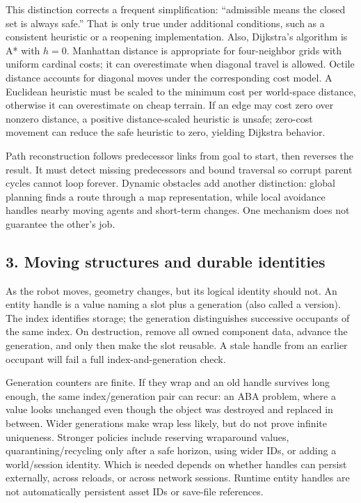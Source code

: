This distinction corrects a frequent simplification: ``admissible means the closed set is always safe.'' That is only true under additional conditions, such as a consistent heuristic or a reopening implementation. Also, Dijkstra's algorithm is A* with \(h=0\). Manhattan distance is appropriate for four-neighbor grids with uniform cardinal costs; it can overestimate when diagonal travel is allowed. Octile distance accounts for diagonal moves under the corresponding cost model. A Euclidean heuristic must be scaled to the minimum cost per world-space distance, otherwise it can overestimate on cheap terrain. If an edge may cost zero over nonzero distance, a positive distance-scaled heuristic is unsafe; zero-cost movement can reduce the safe heuristic to zero, yielding Dijkstra behavior.

Path reconstruction follows predecessor links from goal to start, then reverses the result. It must detect missing predecessors and bound traversal so corrupt parent cycles cannot loop forever. Dynamic obstacles add another distinction: global planning finds a route through a map representation, while local avoidance handles nearby moving agents and short-term changes. One mechanism does not guarantee the other's job.

\subsection{3. Moving structures and durable identities}\label{05-engine-i-ch008-moving-structures-and-durable-identities}

\hypertarget{05-engine-i-ch008-moving-structures-and-durable-identities}{}

As the robot moves, geometry changes, but its logical identity should not. An entity handle is a value naming a slot plus a generation (also called a version). The index identifies storage; the generation distinguishes successive occupants of the same index. On destruction, remove all owned component data, advance the generation, and only then make the slot reusable. A stale handle from an earlier occupant will fail a full index-and-generation check.

Generation counters are finite. If they wrap and an old handle survives long enough, the same index/generation pair can recur: an ABA problem, where a value looks unchanged even though the object was destroyed and replaced in between. Wider generations make wrap less likely, but do not prove infinite uniqueness. Stronger policies include reserving wraparound values, quarantining/recycling only after a safe horizon, using wider IDs, or adding a world/session identity. Which is needed depends on whether handles can persist externally, across reloads, or across network sessions. Runtime entity handles are not automatically persistent asset IDs or save-file references.

